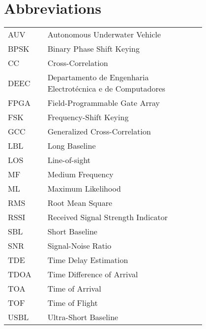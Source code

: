 \chapter*{Abbreviations}

\begin{flushleft}
\begin{tabular}{l p{0.8\linewidth}}
AUV 	  & Autonomous Underwater Vehicle \\
BPSK      & Binary Phase Shift Keying \\
CC 		  & Cross-Correlation \\
DEEC 	  & Departamento de Engenharia Electrotécnica e de Computadores \\
FPGA 	  & Field-Programmable Gate Array \\
FSK		  & Frequency-Shift Keying \\
GCC       & Generalized Cross-Correlation \\
LBL		  & Long Baseline\\
LOS		  & Line-of-sight\\
MF		  & Medium Frequency \\
ML		  & Maximum Likelihood \\
RMS		  & Root Mean Square \\
RSSI 	  & Received Signal Strength Indicator \\
SBL		  & Short Baseline \\
SNR		  & Signal-Noise Ratio\\
TDE 	  & Time Delay Estimation \\
TDOA	  & Time Difference of Arrival \\
TOA		  & Time of Arrival \\
TOF		  & Time of Flight \\
USBL      & Ultra-Short Baseline
\end{tabular}
\end{flushleft}
